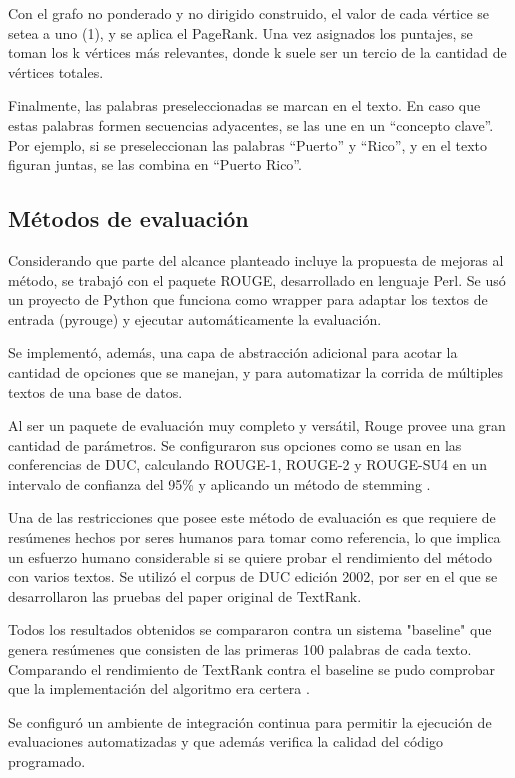 \documentclass[a4paper]{article}
\begin{document}
Con el grafo no ponderado y no dirigido construido, el valor de cada vértice se setea a uno (1), y se aplica el PageRank. Una vez asignados los puntajes, se toman los k vértices más relevantes, donde k suele ser un tercio de la cantidad de vértices totales. 

Finalmente, las palabras preseleccionadas se marcan en el texto. En caso que estas palabras formen secuencias adyacentes, se las une en un “concepto clave”. Por ejemplo, si se preseleccionan las palabras “Puerto” y “Rico”, y en el texto figuran juntas, se las combina en “Puerto Rico”.


\subsection{Métodos de evaluación}
Considerando que parte del alcance planteado incluye la propuesta de mejoras al método, se trabajó con el paquete ROUGE, desarrollado en lenguaje Perl. Se usó un proyecto de Python que funciona como wrapper para adaptar los textos de entrada (pyrouge) y ejecutar automáticamente la evaluación. 

Se implementó, además, una capa de abstracción adicional para acotar la cantidad de opciones que se manejan, y para automatizar la corrida de múltiples textos de una base de datos.

Al ser un paquete de evaluación muy completo y versátil, Rouge provee una gran cantidad de parámetros. Se configuraron sus opciones como se usan en las conferencias de DUC, calculando ROUGE-1, ROUGE-2 y ROUGE-SU4 en un intervalo de confianza del 95\% y aplicando un método de stemming \cite{duc2007}. 

Una de las restricciones que posee este método de evaluación es que requiere de resúmenes hechos por seres humanos para tomar como referencia, lo que implica un esfuerzo humano considerable si se quiere probar el rendimiento del método con varios textos. Se utilizó el corpus de DUC edición 2002, por ser en el que se desarrollaron las pruebas del paper original de TextRank.

Todos los resultados obtenidos se compararon contra un sistema "baseline" que genera resúmenes que consisten de las primeras 100 palabras de cada texto. Comparando el rendimiento de TextRank contra el baseline se pudo comprobar que la implementación del algoritmo era certera \cite{baselines}.

Se configuró un ambiente de integración continua para permitir la ejecución de evaluaciones automatizadas y que además verifica la calidad del código programado. 
\end{document}
